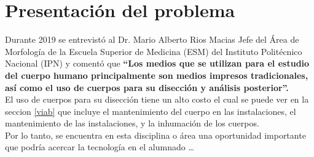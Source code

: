 \chapter{Presentación del problema}
Durante 2019 se entrevistó al Dr. Mario Alberto Rios Macias Jefe del Área de Morfología de la Escuela Superior de Medicina (ESM) 
del Instituto Politécnico Nacional (IPN) y comentó que \textbf{“Los medios que se utilizan para el estudio del cuerpo humano principalmente 
son medios impresos tradicionales, así como el uso de cuerpos para su disección y análisis posterior”.}\\
El uso de cuerpos para su disección tiene un alto costo el cual se puede ver en la seccion \ref{viab}
que incluye el mantenimiento del cuerpo en las instalaciones, el mantenimiento de las instalaciones, y la inhumación de los cuerpos.\\
Por lo tanto, se encuentra en esta disciplina o área una oportunidad importante que podría acercar la tecnología en el alumnado … 

